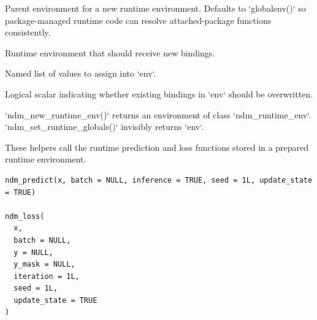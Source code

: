 \documentclass[a4paper]{book}
\begin{document}
\begin{Arguments}
\begin{ldescription}
\item[\code{parent}] Parent environment for a new runtime environment. Defaults to
`globalenv()` so package-managed runtime code can resolve attached-package
functions consistently.

\item[\code{env}] Runtime environment that should receive new bindings.

\item[\code{values}] Named list of values to assign into `env`.

\item[\code{overwrite}] Logical scalar indicating whether existing bindings in `env`
should be overwritten.
\end{ldescription}
\end{Arguments}
%
\begin{Value}
`ndm\_new\_runtime\_env()` returns an environment of class
`ndm\_runtime\_env`. `ndm\_set\_runtime\_globals()` invisibly returns `env`.
\end{Value}
%
\begin{Examples}
\end{Examples}
%
\begin{Description}
These helpers call the runtime prediction and loss functions stored in a
prepared runtime environment.
\end{Description}
%
\begin{Usage}
\begin{verbatim}
ndm_predict(x, batch = NULL, inference = TRUE, seed = 1L, update_state = TRUE)

ndm_loss(
  x,
  batch = NULL,
  y = NULL,
  y_mask = NULL,
  iteration = 1L,
  seed = 1L,
  update_state = TRUE
)
\end{verbatim}
\end{Usage}
%
\end{document}
